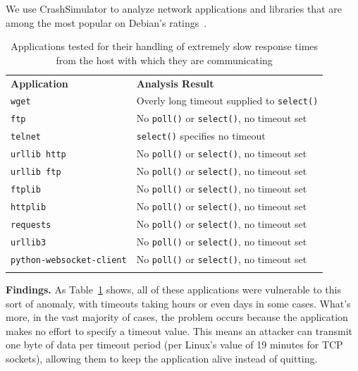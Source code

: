 We use CrashSimulator to analyze  network applications and libraries
that are among the most popular on Debian's ratings~\cite{DebPopCon}. 

\begin{table}[t]
  \scriptsize{}
  \begin{tabular}{l | l}
    \toprule{}
	  {\bf Application}              & {\bf Analysis Result}\\
    {\tt wget}                     & Overly long timeout supplied to {\tt select()} \\
    {\tt ftp}                      & No {\tt poll()} or {\tt select()}, no timeout set \\
    {\tt telnet}                   & {\tt select()} specifies no timeout \\
    {\tt urllib http}              & No {\tt poll()} or {\tt select()}, no timeout set \\
    {\tt urllib ftp}               & No {\tt poll()} or {\tt select()}, no timeout set \\
    {\tt ftplib}                   & No {\tt poll()} or {\tt select()}, no timeout set \\
    {\tt httplib}                  & No {\tt poll()} or {\tt select()}, no timeout set \\
    {\tt requests}                 & No {\tt poll()} or {\tt select()}, no timeout set \\
    {\tt urllib3}                  & No {\tt poll()} or {\tt select()}, no timeout set \\
    {\tt python-websocket-client}  & No {\tt poll()} or {\tt select()}, no timeout set \\
    \bottomrule{}
  \end{tabular}
  \caption{Applications tested for their handling of extremely slow response
    times from the host with which they are communicating }
  \label{table:slowloris}
\end{table}


{\bf Findings.}
 As Table~\ref{table:slowloris} shows, all of these
 applications %
 were vulnerable to this sort of anomaly, with timeouts taking hours or
even days in some cases.
What's more, in the vast
majority of cases, the problem occurs because the application makes no effort to specify a
timeout value.
This means an attacker can transmit one byte of data per timeout
period (per Linux's value of 19 minutes for TCP sockets),
allowing them to keep the application alive instead of quitting.


